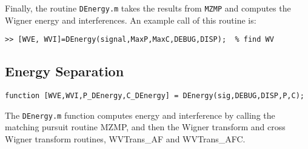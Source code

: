 Finally, the routine {\tt DEnergy.m} takes the results from {\tt MZMP}
and computes the Wigner energy and interferences. An example call of
this routine is:
\begin{verbatim}
>> [WVE, WVI]=DEnergy(signal,MaxP,MaxC,DEBUG,DISP);  % find WV
\end{verbatim}

\subsection{Energy Separation}\label{sec:DEnergy}
\begin{verbatim}
function [WVE,WVI,P_DEnergy,C_DEnergy] = DEnergy(sig,DEBUG,DISP,P,C);
\end{verbatim}
The {\tt DEnergy.m} function computes energy and interference by calling
the matching pursuit routine MZMP, and then the Wigner transform and
cross Wigner transform routines, WVTrans\_AF and WVTrans\_AFC. 
